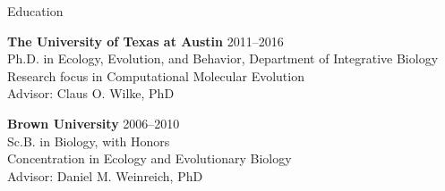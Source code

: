\documentclass{resume} %
\begin{document}
\vspace*{0.35cm}
\begin{rSection}{Education}
\vspace*{0.25cm}

{\bf The University of Texas at Austin} \hfill {2011--2016} \\
Ph.D. in Ecology, Evolution, and Behavior, Department of Integrative Biology \\
Research focus in Computational Molecular Evolution \\
Advisor: Claus O. Wilke, PhD \\

\smallskip

{\bf Brown University} \hfill {2006--2010} \\
Sc.B. in Biology, with Honors \\
Concentration in Ecology and Evolutionary Biology \\
Advisor: Daniel M. Weinreich, PhD \\

\end{rSection}
\end{document}
